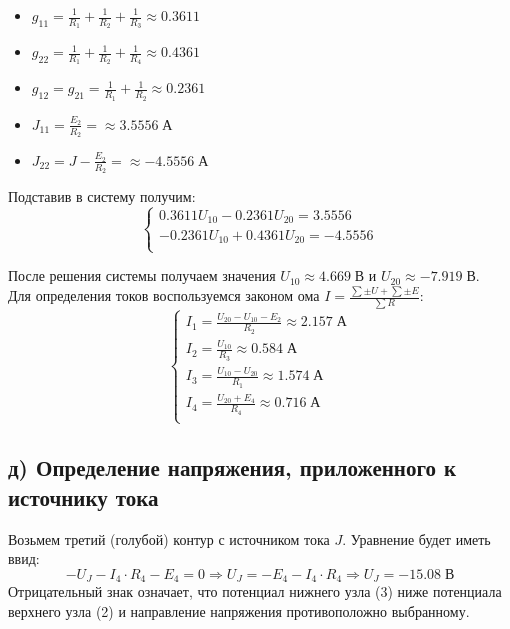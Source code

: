 \documentclass[12pt,fleqn]{article}
\begin{document}
\begin{justify}
    \begin{itemize}
        \item $ g_{11} = \frac{1}{R_1} + \frac{1}{R_2} + \frac{1}{R_3} \approx 0.3611 $
        \item $ g_{22} = \frac{1}{R_1} + \frac{1}{R_2} + \frac{1}{R_4} \approx 0.4361 $
        \item $ g_{12} = g_{21}= \frac{1}{R_1} + \frac{1}{R_2} \approx 0.2361 $
        \item $ J_{11} = \frac{E_2}{R_2} = \approx 3.5556 \; \text{А}$
        \item $ J_{22} = J - \frac{E_2}{R_2} = \approx -4.5556 \; \text{А}$
    \end{itemize}

    Подставив в систему получим: \\
    \begin{equation}
        \begin{cases}
            0.3611U_{10} - 0.2361U_{20} = 3.5556 \\
            -0.2361U_{10} + 0.4361U_{20} = -4.5556 \\        
        \end{cases}
    \end{equation}

    После решения системы получаем значения $U_{10} \approx 4.669 \; \text{В} $ и $U_{20} \approx -7.919 \; \text{В} $.\\

    Для определения токов воспользуемся законом ома $I = \frac{\sum \pm U + \sum \pm E}{\sum R}$:
    \begin{equation}
        \begin{cases}
            I_1 = \frac{U_{20} - U_{10} - E_2}{R_2} \approx 2.157 \; \text{А} \\
            I_2 = \frac{U_{10}}{R_3} \approx 0.584 \; \text{А} \\
            I_3 = \frac{U_{10} - U_{20}}{R_1} \approx 1.574 \; \text{А} \\
            I_4 = \frac{U_{20} + E_4}{R_4} \approx 0.716 \; \text{А} \\
        \end{cases}
    \end{equation}
    

    \newpage

    \subsection{д) Определение напряжения, приложенного к источнику тока}
    Возьмем третий (голубой) контур с источником тока $J$. Уравнение будет иметь ввид:
    \[-U_J - I_4 \cdot R_4 - E_4 = 0 \Rightarrow U_J = -E_4 - I_4 \cdot R_4 \Rightarrow U_J = -15.08 \; \text{В} \]
    Отрицательный знак означает, что потенциал нижнего узла (3) ниже потенциала верхнего узла (2) и направление напряжения противоположно выбранному.\\


\end{justify}
\end{document}
